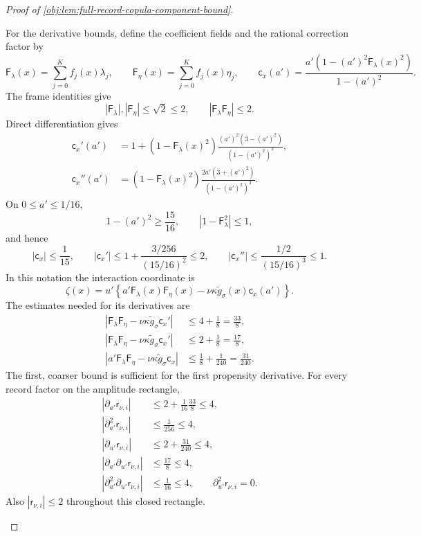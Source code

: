 \documentclass[11pt]{article}
\begin{document}
\begin{proof}[Proof of \cref{obj:lem:full-record-copula-component-bound}]
\begin{enumerate}
For the derivative bounds, define the coefficient fields and the rational correction factor by
\[
\mathsf F_\lambda(x)=\sum_{j=0}^{K}f_j(x)\lambda_j,
\qquad
\mathsf F_\eta(x)=\sum_{j=0}^{K}f_j(x)\eta_j,
\qquad
\mathsf c_x(a')
 =\frac{a'(1-(a')^2\mathsf F_\lambda(x)^2)}
        {1-(a')^2}.
\]
The frame identities give
\[
|\mathsf F_\lambda|,|\mathsf F_\eta|\le\sqrt2\le2,
\qquad
|\mathsf F_\lambda\mathsf F_\eta|\le2.
\]
Direct differentiation gives
\[
\begin{aligned}
\mathsf c_x'(a')
 &=1+
 (1-\mathsf F_\lambda(x)^2)
 \frac{(a')^2(3-(a')^2)}{(1-(a')^2)^2},\\
\mathsf c_x''(a')
 &=(1-\mathsf F_\lambda(x)^2)
 \frac{2a'(3+(a')^2)}{(1-(a')^2)^3}.
\end{aligned}
\]
On \(0\le a'\le1/16\),
\[
1-(a')^2\ge\frac{15}{16},
\qquad
|1-\mathsf F_\lambda^2|\le1,
\]
and hence
\[
|\mathsf c_x|\le\frac1{15},
\qquad
|\mathsf c_x'|
 \le1+\frac{3/256}{(15/16)^2}\le2,
\qquad
|\mathsf c_x''|
 \le\frac{1/2}{(15/16)^3}\le1.
\]
In this notation the interaction coordinate is
\[
\zeta(x)
 =u'\left\{
 a'\mathsf F_\lambda(x)\mathsf F_\eta(x)
 -\nu\kappa\widetilde g_\sigma(x)\mathsf c_x(a')
 \right\}.
\]
The estimates needed for its derivatives are
\[
\begin{aligned}
|\mathsf F_\lambda\mathsf F_\eta
 -\nu\kappa\widetilde g_\sigma\mathsf c_x'|
 &\le 4+\frac18=\frac{33}{8},\\
|\mathsf F_\lambda\mathsf F_\eta
 -\nu\kappa\widetilde g_\sigma\mathsf c_x'|
 &\le 2+\frac18=\frac{17}{8},\\
|a'\mathsf F_\lambda\mathsf F_\eta
 -\nu\kappa\widetilde g_\sigma\mathsf c_x|
 &\le\frac18+\frac1{240}=\frac{31}{240}.
\end{aligned}
\]
The first, coarser bound is sufficient for the first propensity derivative. For every record factor on the amplitude rectangle,
\[
\begin{aligned}
|\partial_{a'}\mathsf r_{\nu,i}|
 &\le2+\frac1{16}\frac{33}{8}\le4,\\
|\partial_{a'}^2\mathsf r_{\nu,i}|
 &\le\frac1{256}\le4,\\
|\partial_{u'}\mathsf r_{\nu,i}|
 &\le2+\frac{31}{240}\le4,\\
|\partial_{a'}\partial_{u'}\mathsf r_{\nu,i}|
 &\le\frac{17}{8}\le4,\\
|\partial_{a'}^2\partial_{u'}\mathsf r_{\nu,i}|
 &\le\frac1{16}\le4,
\qquad
\partial_{u'}^2\mathsf r_{\nu,i}=0.
\end{aligned}
\]
Also \(|\mathsf r_{\nu,i}|\le2\) throughout this closed rectangle.


\end{enumerate}
\end{proof}
\end{document}
